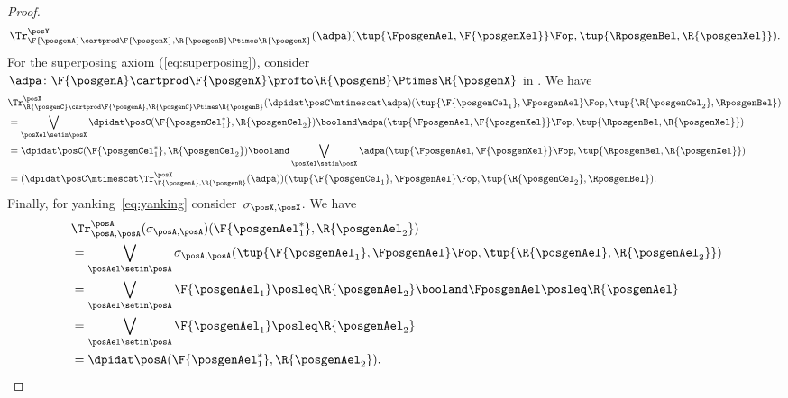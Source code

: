 {\begin{proof}
\begin{equation}
\begin{aligned}
{                    \Tr_{\F{\posgenA}\cartprod \F{\posgenX},\R{\posgenB}\Ptimes \R{\posgenX}}^\posY(\adpa)(\tup{\FposgenAel,\F{\posgenXel}}\Fop,\tup{\RposgenBel,\R{\posgenXel}})}.
            \end{aligned}
        \end{equation}
        For the superposing axiom (\cref{eq:superposing}), consider~$\adpa\colon \F{\posgenA}\cartprod \F{\posgenX}\profto \R{\posgenB}\Ptimes \R{\posgenX}$ in \DP.
        We have
        \begin{equation}
            \begin{aligned}
                {}
                 & \Tr_{\R{\posgenC}\cartprod \F{\posgenA},\R{\posgenC}\Ptimes \R{\posgenB}}^{\posX}(\dpidat\posC\mtimescat \adpa)(\tup{\F{\posgenCel_1},\FposgenAel}\Fop,\tup{\R{\posgenCel_2},\RposgenBel}) \\
                 & = \bigvee_{\posXel \setin \posX} \dpidat\posC(\F{\posgenCel_1^*},\R{\posgenCel_2})\booland \adpa(\tup{\FposgenAel,\F{\posgenXel}}\Fop,\tup{\RposgenBel,\R{\posgenXel}}) \\
                 & =\dpidat\posC(\F{\posgenCel_1^*},\R{\posgenCel_2}) \booland \bigvee_{\posXel\setin \posX} \adpa(\tup{\FposgenAel,\F{\posgenXel}}\Fop,\tup{\RposgenBel,\R{\posgenXel}}) \\
                 & =(\dpidat\posC \mtimescat \Tr_{\F{\posgenA},\R{\posgenB}}^\posX(\adpa))(\tup{\F{\posgenCel_1},\FposgenAel}\Fop,\tup{\R{\posgenCel_2},\RposgenBel}).
            \end{aligned}
        \end{equation}
        Finally, for yanking~\cref{eq:yanking} consider~$\sigma_{\posX,\posX}$.
        We have
        \begin{equation}
            \begin{aligned}
                ~ & \Tr_{\posA,\posA}^{\posA}(\sigma_{\posA,\posA})(\F{\posgenAel_1^*},\R{\posgenAel_2}) \\
                  & = \bigvee_{\posAel\setin \posA} \sigma_{\posA,\posA}(\tup{\F{\posgenAel_1},\FposgenAel}\Fop,\tup{\R{\posgenAel},\R{\posgenAel_2}}) \\
                  & =\bigvee_{\posAel\setin \posA} \F{\posgenAel_1} \posleq \R{\posgenAel_2} \booland \FposgenAel\posleq \R{\posgenAel} \\
                  & =\bigvee_{\posAel\setin \posA} \F{\posgenAel_1} \posleq \R{\posgenAel_2} \\
                  & =\dpidat\posA(\F{\posgenAel_1^*},\R{\posgenAel_2}).
            \end{aligned}
        \end{equation}
    \end{proof}
}
